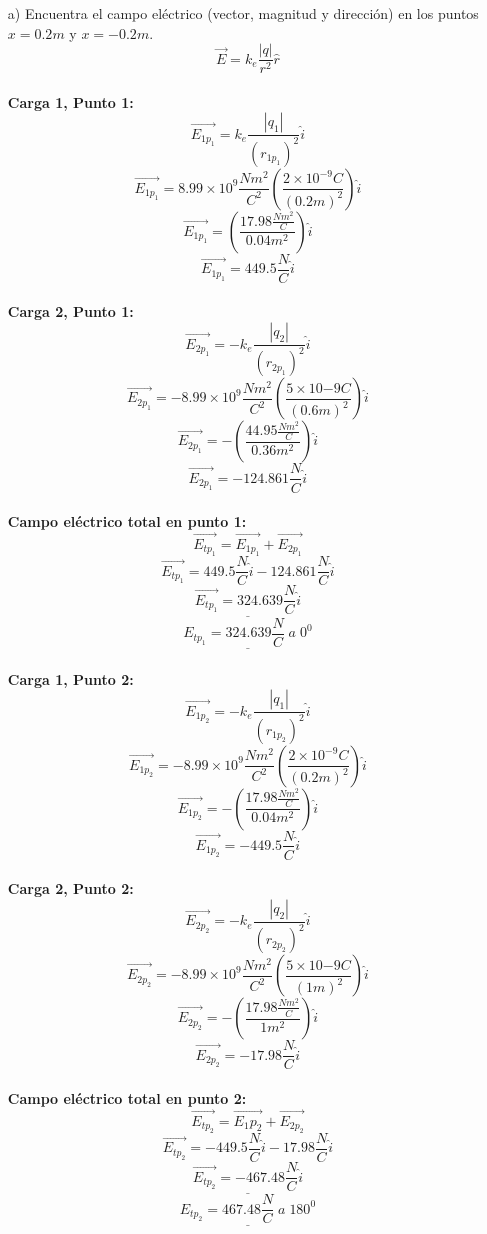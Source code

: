 \documentclass[12pt]{article}
\begin{document}
				\begin{enumerate}
					\item[a)]	Encuentra el campo eléctrico (vector, magnitud y dirección) en los
							puntos $ x = 0.2m $ y $ x = -0.2m $. 
							$$ \vec{E} = k_e \frac{|q|}{r^2} \hat{r} $$ \\
							\textbf{Carga 1, Punto 1:}
							$$ \vec{E_{1p_1}} = k_e \frac{|q_1|}{(r_{1p_1})^2} \hat{i} $$
							$$ \vec{E_{1p_1}} = 8.99 \times 10^9 \frac{Nm^2}{C^2} \left( \frac{2 \times 10^{-9}C}{(0.2m)^2} \right) \hat{i} $$
							$$ \vec{E_{1p_1}} = \left( \frac{17.98 \frac{Nm^2}{C}}{0.04m^2} \right) \hat{i} $$
							$$ \vec{E_{1p_1}} = 449.5 \frac{N}{C} \hat{i} $$ \\
							\textbf{Carga 2, Punto 1:}
							$$ \vec{E_{2p_1}} = -k_e \frac{|q_2|}{(r_{2p_1})^2} \hat{i} $$
							$$ \vec{E_{2p_1}} = -8.99 \times 10^9 \frac{Nm^2}{C^2} \left( \frac{5 \times 10{-9}C}{(0.6m)^2} \right) \hat{i} $$
							$$ \vec{E_{2p_1}} = -\left( \frac{44.95 \frac{Nm^2}{C}}{0.36m^2} \right) \hat{i} $$
							$$ \vec{E_{2p_1}} = -124.861 \frac{N}{C} \hat{i} $$ \\
							\textbf{Campo eléctrico total en punto 1:}
							$$ \vec{E_{tp_1}} = \vec{E_{1p_1}} + \vec{E_{2p_1}} $$
							$$ \vec{E_{tp_1}} = 449.5 \frac{N}{C} \hat{i} - 124.861 \frac{N}{C} \hat{i} $$
							$$ \underline{\vec{E_{tp_1}} = 324.639 \frac{N}{C} \hat{i}} $$
							$$ \underline{E_{tp_1} = 324.639 \frac{N}{C} \; a \; 0^0} $$ \\
							\textbf{Carga 1, Punto 2:}
							$$ \vec{E_{1p_2}} = -k_e \frac{|q_1|}{(r_{1p_2})^2} \hat{i} $$
							$$ \vec{E_{1p_2}} = -8.99 \times 10^9 \frac{Nm^2}{C^2} \left( \frac{2 \times 10^{-9}C}{(0.2m)^2} \right) \hat{i} $$
							$$ \vec{E_{1p_2}} = -\left( \frac{17.98 \frac{Nm^2}{C}}{0.04m^2} \right) \hat{i} $$
							$$ \vec{E_{1p_2}} = -449.5 \frac{N}{C} \hat{i} $$ \\
							\textbf{Carga 2, Punto 2:}
							$$ \vec{E_{2p_2}} = -k_e \frac{|q_2|}{(r_{2p_2})^2} \hat{i} $$
							$$ \vec{E_{2p_2}} = -8.99 \times 10^9 \frac{Nm^2}{C^2} \left( \frac{5 \times 10{-9}C}{(1m)^2} \right) \hat{i} $$
							$$ \vec{E_{2p_2}} = -\left( \frac{17.98 \frac{Nm^2}{C}}{1m^2} \right) \hat{i} $$
							$$ \vec{E_{2p_2}} = -17.98 \frac{N}{C} \hat{i} $$ \\
							\textbf{Campo eléctrico total en punto 2:}
							$$ \vec{E_{tp_2}} = \vec{E_1{p_2}} + \vec{E_{2p_2}} $$
							$$ \vec{E_{tp_2}} = -449.5 \frac{N}{C} \hat{i} - 17.98 \frac{N}{C} \hat{i}$$
							$$ \underline{\vec{E_{tp_2}} = -467.48 \frac{N}{C} \hat{i}} $$
							$$ \underline{E_{tp_2} = 467.48 \frac{N}{C} \; a \; 180^0} $$ \\



\end{enumerate}
\end{document}
